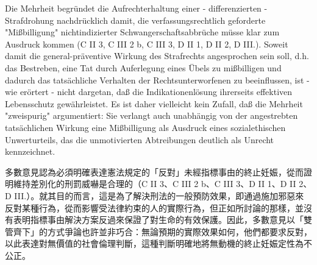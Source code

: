 \documentclass[12pt]{article}
\begin{document}
\syncleft
\begin{sourcepara}
Die Mehrheit begründet die Aufrechterhaltung einer - differenzierten - Strafdrohung nachdrücklich damit, die verfassungsrechtlich geforderte "Mißbilligung" nichtindizierter Schwangerschaftsabbrüche müsse klar zum Ausdruck kommen (C II 3, C III 2 b, C III 3, D II 1, D II 2, D III.). Soweit damit die general-präventive Wirkung des Strafrechts angesprochen sein soll, d.h. das Bestreben, eine Tat durch Auferlegung eines Übels zu mißbilligen und dadurch das tatsächliche Verhalten der Rechtsunterworfenen zu beeinflussen, ist - wie erörtert - nicht dargetan, daß die Indikationenlösung ihrerseits effektiven Lebensschutz gewährleistet. Es ist daher vielleicht kein Zufall, daß die Mehrheit "zweispurig" argumentiert: Sie verlangt auch unabhängig von der angestrebten tatsächlichen Wirkung eine Mißbilligung als Ausdruck eines sozialethischen Unwerturteils, das die unmotivierten Abtreibungen deutlich als Unrecht kennzeichnet.
\end{sourcepara}
\begin{transpara}
多數意見認為必須明確表達憲法規定的「反對」未經指標事由的終止妊娠，從而證明維持差別化的刑罰威嚇是合理的（C II 3、C III 2 b、C III 3、D II 1、D II 2、D III.）。就其目的而言，這是為了解決刑法的一般預防效果，即通過施加邪惡來反對某種行為，從而影響受法律約束的人的實際行為，但正如所討論的那樣，並沒有表明指標事由解決方案反過來保證了對生命的有效保護。因此，多數意見以「雙管齊下」的方式爭論也許並非巧合：無論預期的實際效果如何，他們都要求反對，以此表達對無價值的社會倫理判斷，這​​種判斷明確地將無動機的終止妊娠定性為不公正。
\end{transpara}
\end{document}
